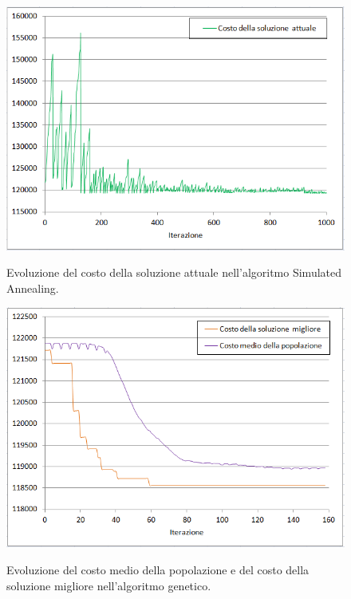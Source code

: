 \begin{figure}[h] 
\begin{center} 
  \includegraphics[scale=0.7]{Images/cost_sa}\\ 
  \caption{\footnotesize{Evoluzione del costo della soluzione attuale nell'algoritmo Simulated Annealing.}}
  \label{cost_sa} 
\end{center} 
\end{figure}
\begin{figure}[h]
\begin{center} 
  \includegraphics[scale=0.7]{Images/cost_genetic}\\ 
  \caption{\footnotesize{Evoluzione del costo medio della popolazione e del costo della soluzione migliore nell'algoritmo genetico.}}
  \label{cost_genetic} 
\end{center} 
\end{figure}